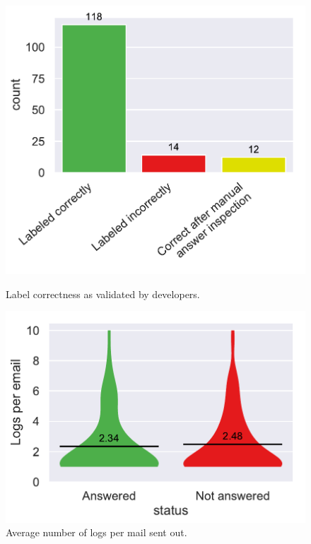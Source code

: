 \documentclass[\myrootdir/main.tex]{subfiles}
\begin{document}
\begin{figure}[htbp]
	\centering
	\begin{minipage}{0.45\textwidth}
		\centering
		\includegraphics[width=\textwidth, clip]{img/dev-mails/extraction-correct.pdf}
		\caption{Label correctness as validated by developers.}
		\label{fig:mails-extraction-correct}
	\end{minipage}\hfill
	\begin{minipage}{0.45\textwidth}
		\centering
		\includegraphics[width=\textwidth, clip]{img/dev-mails/logs-per-mail.pdf}
		\caption{Average number of logs per mail sent out.}
		\label{fig:mails-logs-per-mail}
	\end{minipage}
\end{figure}
\end{document}
